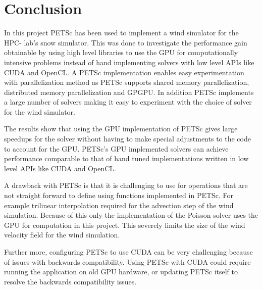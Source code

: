 \chapter{Conclusion}
\label{chap:conclusion}

In this project PETSc has been used to implement a wind simulator for the HPC-
lab's snow simulator. This was done to investigate the performance gain
obtainable by using high level libraries to use the GPU for computationally
intensive problems instead of hand implementing solvers with low level APIs like
CUDA and OpenCL. A PETSc implementation enables easy experimentation with
parallelization method as PETSc supports shared memory parallelization,
distributed memory parallelization and GPGPU. In addition PETSc implements a
large number of solvers making it easy to experiment with the choice of solver
for the wind simulator.

The results show that using the GPU implementation of PETSc gives large speedups
for the solver without having to make special adjustments to the code to account
for the GPU. PETSc's GPU implemented solvers can achieve performance comparable
to that of hand tuned implementations written in low level APIs like CUDA and
OpenCL.

A drawback with PETSc is that it is challenging to use for
operations that are not straight forward to define using functions implemented
in PETSc. For example trilinear interpolation required for the advection step of
the wind simulation. Because of this only the implementation of the Poisson
solver uses the GPU for computation in this project. This severely limits the
size of the wind velocity field for the wind simulation.

Further more, configuring PETSc to use CUDA can be very challenging because of
issues with backwards compatibility. Using PETSc with CUDA could require running
the application on old GPU hardware, or updating PETSc itself to resolve the
backwards compatibility issues.
